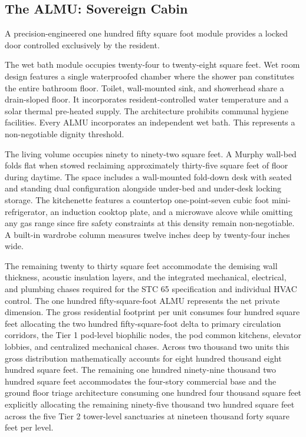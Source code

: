 \documentclass[12pt, letterpaper]{article}
\begin{document}
\subsection{The ALMU: Sovereign Cabin}

A precision-engineered one hundred fifty square foot module provides a locked door controlled exclusively by the resident.

The wet bath module occupies twenty-four to twenty-eight square feet. Wet room design features a single waterproofed chamber where the shower pan constitutes the entire bathroom floor. Toilet, wall-mounted sink, and showerhead share a drain-sloped floor. It incorporates resident-controlled water temperature and a solar thermal pre-heated supply. The architecture prohibits communal hygiene facilities. Every ALMU incorporates an independent wet bath. This represents a non-negotiable dignity threshold.

The living volume occupies ninety to ninety-two square feet. A Murphy wall-bed folds flat when stowed reclaiming approximately thirty-five square feet of floor during daytime. The space includes a wall-mounted fold-down desk with seated and standing dual configuration alongside under-bed and under-desk locking storage. The kitchenette features a countertop one-point-seven cubic foot mini-refrigerator, an induction cooktop plate, and a microwave alcove while omitting any gas range since fire safety constraints at this density remain non-negotiable. A built-in wardrobe column measures twelve inches deep by twenty-four inches wide.

The remaining twenty to thirty square feet accommodate the demising wall thickness, acoustic insulation layers, and the integrated mechanical, electrical, and plumbing chases required for the STC 65 specification and individual HVAC control. The one hundred fifty-square-foot ALMU represents the net private dimension. The gross residential footprint per unit consumes four hundred square feet allocating the two hundred fifty-square-foot delta to primary circulation corridors, the Tier 1 pod-level biophilic nodes, the pod common kitchens, elevator lobbies, and centralized mechanical chases. Across two thousand two units this gross distribution mathematically accounts for eight hundred thousand eight hundred square feet. The remaining one hundred ninety-nine thousand two hundred square feet accommodates the four-story commercial base and the ground floor triage architecture consuming one hundred four thousand square feet explicitly allocating the remaining ninety-five thousand two hundred square feet across the five Tier 2 tower-level sanctuaries at nineteen thousand forty square feet per level.
\end{document}
